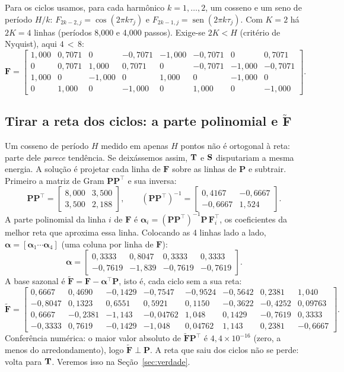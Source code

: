 \documentclass[11pt,a4paper]{article}
\newcommand{\bP}{\mathbf{P}}\newcommand{\bF}{\mathbf{F}}\newcommand{\bFt}{\widetilde{\mathbf{F}}}\newcommand{\bQ}{\mathbf{Q}}
\DeclareMathOperator{\sen}{sen}
\begin{document}
Para os ciclos usamos, para cada harmônico $k=1,\dots,2$, um cosseno e um seno de período $H/k$: $F_{2k-2,j}=\cos(2\pi k\tau_j)$ e $F_{2k-1,j}=\sen(2\pi k\tau_j)$. Com $K=2$ há $2K=4$ linhas (períodos 8,000 e 4,000 passos). Exige-se $2K<H$ (critério de Nyquist), aqui $4\,<\,8$:
\[\bF=\begin{bmatrix}1,000 & 0,7071 & 0 & -0,7071 & -1,000 & -0,7071 & 0 & 0,7071 \\ 0 & 0,7071 & 1,000 & 0,7071 & 0 & -0,7071 & -1,000 & -0,7071 \\ 1,000 & 0 & -1,000 & 0 & 1,000 & 0 & -1,000 & 0 \\ 0 & 1,000 & 0 & -1,000 & 0 & 1,000 & 0 & -1,000\end{bmatrix}.\]

\subsection{Tirar a reta dos ciclos: a parte polinomial e $\bFt$}

Um cosseno de período $H$ medido em apenas $H$ pontos não é ortogonal à reta: parte dele \emph{parece} tendência. Se deixássemos assim, $\mathbf{T}$ e $\mathbf{S}$ disputariam a mesma energia. A solução é projetar cada linha de $\bF$ sobre as linhas de $\bP$ e subtrair. Primeiro a matriz de Gram $\bP\bP^\top$ e sua inversa:
\[\bP\bP^\top=\begin{bmatrix}8,000 & 3,500 \\ 3,500 & 2,188\end{bmatrix},\qquad (\bP\bP^\top)^{-1}=\begin{bmatrix}0,4167 & -0,6667 \\ -0,6667 & 1,524\end{bmatrix}.\]
A parte polinomial da linha $i$ de $\bF$ é $\boldsymbol\alpha_i=(\bP\bP^\top)^{-1}\bP\,\bF_i^\top$, os coeficientes da melhor reta que aproxima essa linha. Colocando as 4 linhas lado a lado, $\boldsymbol\alpha=\left[\boldsymbol\alpha_1\cdots\boldsymbol\alpha_{4}\right]$ (uma coluna por linha de $\bF$):
\[\boldsymbol\alpha=\begin{bmatrix}0,3333 & 0,8047 & 0,3333 & 0,3333 \\ -0,7619 & -1,839 & -0,7619 & -0,7619\end{bmatrix}.\]
A base sazonal é $\bFt=\bF-\boldsymbol\alpha^\top\bP$, isto é, cada ciclo sem a sua reta:
\[\bFt=\begin{bmatrix}0,6667 & 0,4690 & -0,1429 & -0,7547 & -0,9524 & -0,5642 & 0,2381 & 1,040 \\ -0,8047 & 0,1323 & 0,6551 & 0,5921 & 0,1150 & -0,3622 & -0,4252 & 0,09763 \\ 0,6667 & -0,2381 & -1,143 & -0,04762 & 1,048 & 0,1429 & -0,7619 & 0,3333 \\ -0,3333 & 0,7619 & -0,1429 & -1,048 & 0,04762 & 1,143 & 0,2381 & -0,6667\end{bmatrix}.\]
Conferência numérica: o maior valor absoluto de $\bFt\bP^\top$ é $4,4\times 10^{-16}$ (zero, a menos do arredondamento), logo $\bFt\perp\bP$. A reta que saiu dos ciclos não se perde: volta para $\mathbf{T}$. Veremos isso na Seção~\ref{sec:verdade}.
\end{document}
